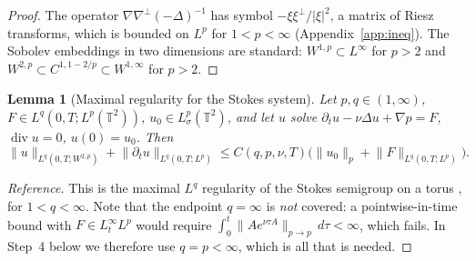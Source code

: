 \documentclass[11pt]{article}
\newtheorem{lemma}[theorem]{Lemma}
\theoremstyle{remark}
\newcommand{\T}{\mathbb{T}}
\newcommand{\norm}[1]{\lVert #1\rVert}
\newcommand{\abs}[1]{\lvert #1\rvert}
\newcommand{\Div}{\operatorname{div}}
\begin{document}
\begin{proof}
The operator $\nabla\nabla^\perp(-\Delta)^{-1}$ has symbol
$-\xi\xi^\perp/\abs{\xi}^2$, a matrix of Riesz transforms, which is bounded on $L^p$ for
$1<p<\infty$ (Appendix~\ref{app:ineq}). The Sobolev embeddings in two dimensions are
standard: $W^{1,p}\subset L^\infty$ for $p>2$ and $W^{2,p}\subset C^{1,1-2/p}\subset
W^{1,\infty}$ for $p>2$.
\end{proof}

\begin{lemma}[Maximal regularity for the Stokes system]\label{lem:maxreg}
Let $p,q\in(1,\infty)$, $F\in L^q(0,T;L^p(\T^2))$, $u_0\in L^p_\sigma(\T^2)$, and let $u$
solve $\partial_tu-\nu\Delta u+\nabla p=F$, $\Div u=0$, $u(0)=u_0$. Then
\begin{equation}\label{eq:maxreg}
\norm{u}_{L^q(0,T;W^{2,p})}+\norm{\partial_tu}_{L^q(0,T;L^p)}
\le C(q,p,\nu,T)\bigl(\norm{u_0}_{p}+\norm{F}_{L^q(0,T;L^p)}\bigr).
\end{equation}
\end{lemma}

\begin{proof}[Reference]
This is the maximal $L^q$ regularity of the Stokes semigroup on a torus
\cite{GigaSohr1991}, for $1<q<\infty$. Note that the endpoint $q=\infty$ is \emph{not}
covered: a pointwise-in-time bound with $F\in L^\infty_tL^p$ would require
$\int_0^t\norm{Ae^{\nu\tau A}}_{p\to p}\,d\tau<\infty$, which fails. In Step~4 below we
therefore use $q=p<\infty$, which is all that is needed.
\end{proof}
\end{document}
